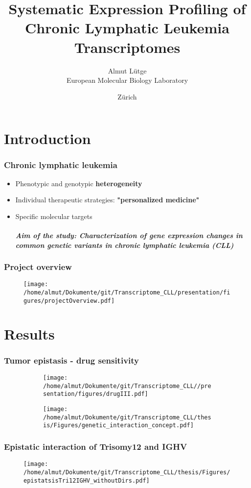 \documentclass[xcolor=dvipsnames,t,10pt]{beamer}
\title[Expression profiling CLL]{Systematic Expression Profiling of Chronic Lymphatic Leukemia Transcriptomes}
\author[Almut Lütge - European Molecular Biology Laboratory]{Almut Lütge\\European Molecular Biology Laboratory}
\date{Zürich \\ \bigskip {\monthyeardate{\today}}}
\begin{document}
\begin{frame}
  \titlepage
\end{frame}
%
\section{Introduction}
%
\begin{frame}[c]
	\frametitle{Chronic lymphatic leukemia}
	\begin{itemize}
	\item Phenotypic and genotypic \textbf{heterogeneity} 
	\item Individual therapeutic strategies: \textbf{"personalized medicine"}
	\item Specific molecular targets 
	\\~\\
	\textbf{\textit{Aim of the study: Characterization of gene expression changes in common genetic variants in chronic lymphatic leukemia  (CLL)}}
	\end{itemize}
\end{frame}
%
%
\begin{frame}[c]
\frametitle{Project overview}
\begin{figure}
\centering
\texttt{[image: /home/almut/Dokumente/git/Transcriptome\_CLL/presentation/figures/projectOverview.pdf]}
\end{figure}
\end{frame}
%
\section{Results}
%
%
\begin{frame}[c]
	\frametitle{Tumor epistasis - drug sensitivity}
	\begin{figure}
		\centering
		\begin{subfigure}[t]{0.48\columnwidth}
			\texttt{[image: /home/almut/Dokumente/git/Transcriptome\_CLL//presentation/figures/drugIII.pdf]}
		\end{subfigure}
		\hfill
		\begin{subfigure}[t]{0.45\columnwidth}
			\texttt{[image: /home/almut/Dokumente/git/Transcriptome\_CLL/thesis/Figures/genetic\_interaction\_concept.pdf]}
		\end{subfigure}
	\end{figure}
\end{frame}
%
%
\begin{frame}[c]
	\frametitle{Epistatic interaction of Trisomy12 and IGHV}
	\begin{figure}
		\centering
		\texttt{[image: /home/almut/Dokumente/git/Transcriptome\_CLL/thesis/Figures/epistatsisTri12IGHV\_withoutDirs.pdf]}
	\end{figure}
\end{frame}
\end{document}
